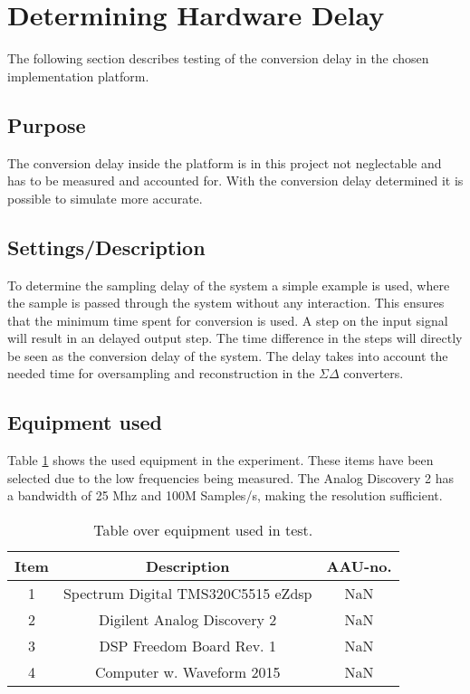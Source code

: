 \section{Determining Hardware Delay} \label{sec:HardwareDelay}

The following section describes testing of the conversion delay in the chosen implementation platform.

\subsection{Purpose}

The conversion delay inside the platform is in this project not neglectable and has to be measured and accounted for. With the conversion delay determined it is possible to simulate more accurate. %


\subsection{Settings/Description}

To determine the sampling delay of the system a simple example is used, where the sample is passed through the system without any interaction. This ensures that the minimum time spent for conversion is used. A step on the input signal will result in an delayed output step. The time difference in the steps will directly be seen as the conversion delay of the system. The delay takes into account the needed time for oversampling and reconstruction in the $\Sigma \Delta$ converters.


\subsection{Equipment used}
Table \ref{tab:MeasDelayTable} shows the used equipment in the experiment. These items have been selected due to the low frequencies being measured. The Analog Discovery 2 has a bandwidth of 25 Mhz and 100M Samples/s, making the resolution sufficient.  
\begin{table}[H]
	\centering
	\begin{tabular}{ c c c } \toprule
		{Item}	& {Description} 						& {AAU-no}. \\ \bottomrule 
		1	&	Spectrum Digital TMS320C5515 eZdsp	& NaN	\\
		2	&	Digilent Analog Discovery 2	& NaN		\\
		3	&	DSP Freedom Board Rev. 1 & NaN		\\
		4	&	Computer w. Waveform 2015					& NaN		\\
		\bottomrule
	\end{tabular}
	\caption{Table over equipment used in test.}
	\label{tab:MeasDelayTable}
\end{table}

